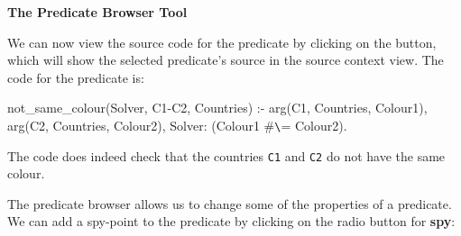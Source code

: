 \begin{center}

\vspace{3mm}
{\bf The Predicate Browser Tool}
\end{center}

We can now view the source code for the predicate by clicking on the
 button, which will show the selected predicate's source in
the source context view. The code for the predicate is:

\begin{code}
not_same_colour(Solver, C1-C2, Countries) :-
      arg(C1, Countries, Colour1),
      arg(C2, Countries, Colour2),
      Solver: (Colour1 #\verb'\'= Colour2).
\end{code}

The code does indeed check that the countries \verb'C1' and \verb'C2' do
not have the same colour.


The predicate browser allows us to change some of the properties of a predicate.
We can add a spy-point to the predicate by clicking on the radio button for
{\bf spy}: 

